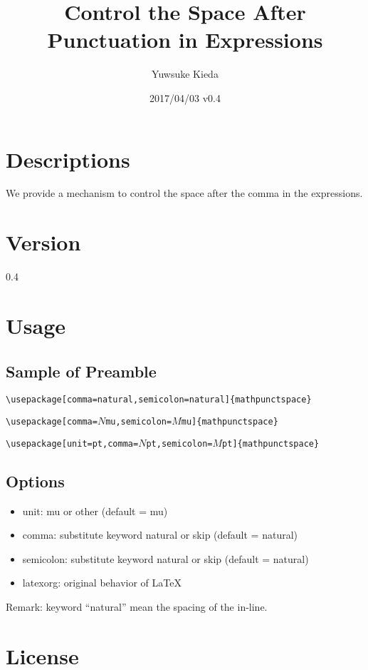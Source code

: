 \documentclass{article}
\title{Control the Space After Punctuation in Expressions}
\author{Yuwsuke Kieda}
\date{2017/04/03 v0.4}
\begin{document}
\maketitle

\section{Descriptions}

We provide a mechanism to control the space after the comma in the expressions.

\section{Version}

0.4

\section{Usage}

\subsection{Sample of Preamble}

\noindent
\verb!\!\texttt{usepackage[comma=natural,semicolon=natural]}\verb!{mathpunctspace}!

\noindent
\verb!\!\texttt{usepackage[comma=$N$mu,semicolon=$M$mu]}\verb!{mathpunctspace}!

\noindent
\verb!\!\texttt{usepackage[unit=pt,comma=$N$pt,semicolon=$M$pt]}\verb!{mathpunctspace}!

\subsection{Options}

\begin{itemize}
 \item unit: mu or other (default = mu)
 \item comma: substitute keyword natural or skip (default = natural)
 \item semicolon: substitute keyword natural or skip (default = natural)
 \item latexorg: original behavior of LaTeX
\end{itemize}

Remark: keyword ``natural'' mean the spacing of the in-line.

\section{License}
\end{document}
